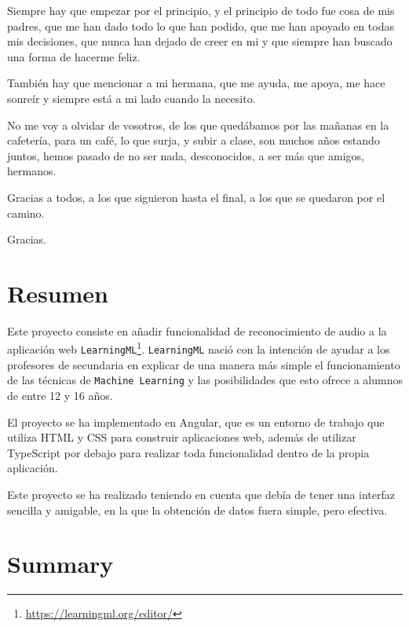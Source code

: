 \documentclass[a4paper, 12pt]{book}
\begin{document}
Siempre hay que empezar por el principio, y el principio de todo fue cosa de mis padres, que me han dado todo lo que han podido, que me han apoyado en todas mis decisiones, que nunca han dejado de creer en mi y que siempre han buscado una forma de hacerme feliz.

También hay que mencionar a mi hermana, que me ayuda, me apoya, me hace sonreír y siempre está a mi lado cuando la necesito.

No me voy a olvidar de vosotros, de los que quedábamos por las mañanas en la cafetería, para un café, lo que surja, y subir a clase, son muchos años estando juntos, hemos pasado de no ser nada, desconocidos, a ser más que amigos, hermanos.

Gracias a todos, a los que siguieron hasta el final, a los que se quedaron por el camino.

Gracias.


\chapter*{Resumen}

Este proyecto consiste en añadir funcionalidad de reconocimiento de audio a la aplicación web \texttt{LearningML}\footnote{\url{https://learningml.org/editor/}}. \texttt{LearningML} nació con la intención de ayudar a los profesores de secundaria en explicar de una manera más simple el funcionamiento de las técnicas de \texttt{Machine Learning} y las posibilidades que esto ofrece a alumnos de entre 12 y 16 años.

El proyecto se ha implementado en Angular, que es un entorno de trabajo que utiliza HTML y CSS para construir aplicaciones web, además de utilizar TypeScript por debajo para realizar toda funcionalidad dentro de la propia aplicación.

Este proyecto se ha realizado teniendo en cuenta que debía de tener una interfaz sencilla y amigable, en la que la obtención de datos fuera simple, pero efectiva.


\chapter*{Summary}
\end{document}

